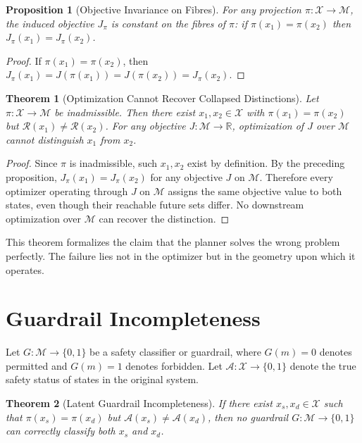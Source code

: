 \documentclass[12pt,a4paper]{article}
\theoremstyle{plain}
\newtheorem{theorem}{Theorem}
\newtheorem{proposition}{Proposition}
\theoremstyle{definition}
\theoremstyle{remark}
\begin{document}
\begin{proposition}[Objective Invariance on Fibres]
For any projection $\pi : \mathcal{X} \to \mathcal{M}$, the induced objective
$J_\pi$ is constant on the fibres of $\pi$: if $\pi(x_1) = \pi(x_2)$ then
$J_\pi(x_1) = J_\pi(x_2)$.
\end{proposition}

\begin{proof}
If $\pi(x_1) = \pi(x_2)$, then
$J_\pi(x_1) = J(\pi(x_1)) = J(\pi(x_2)) = J_\pi(x_2)$.
\end{proof}

\begin{theorem}[Optimization Cannot Recover Collapsed Distinctions]
Let $\pi : \mathcal{X} \to \mathcal{M}$ be inadmissible. Then there exist
$x_1, x_2 \in \mathcal{X}$ with $\pi(x_1) = \pi(x_2)$ but
$\mathcal{R}(x_1) \neq \mathcal{R}(x_2)$. For any objective
$J : \mathcal{M} \to \mathbb{R}$, optimization of $J$ over $\mathcal{M}$
cannot distinguish $x_1$ from $x_2$.
\end{theorem}

\begin{proof}
Since $\pi$ is inadmissible, such $x_1, x_2$ exist by definition. By the
preceding proposition, $J_\pi(x_1) = J_\pi(x_2)$ for any objective $J$ on
$\mathcal{M}$. Therefore every optimizer operating through $J$ on $\mathcal{M}$
assigns the same objective value to both states, even though their reachable
future sets differ. No downstream optimization over $\mathcal{M}$ can recover
the distinction.
\end{proof}

This theorem formalizes the claim that the planner solves the wrong problem
perfectly. The failure lies not in the optimizer but in the geometry upon which
it operates.

\section{Guardrail Incompleteness}

Let $G : \mathcal{M} \to \{0, 1\}$ be a safety classifier or guardrail, where
$G(m) = 0$ denotes permitted and $G(m) = 1$ denotes forbidden. Let
$\mathcal{A} : \mathcal{X} \to \{0, 1\}$ denote the true safety status of
states in the original system.

\begin{theorem}[Latent Guardrail Incompleteness]
If there exist $x_s, x_d \in \mathcal{X}$ such that $\pi(x_s) = \pi(x_d)$
but $\mathcal{A}(x_s) \neq \mathcal{A}(x_d)$, then no guardrail
$G : \mathcal{M} \to \{0, 1\}$ can correctly classify both $x_s$ and $x_d$.
\end{theorem}
\end{document}
